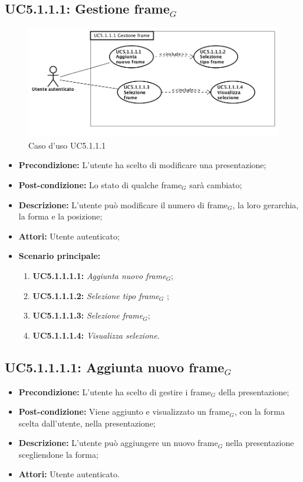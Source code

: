 \subsection{ UC5.1.1.1: Gestione frame$_G$}

\begin{figure}[h]
	\begin{center}
	\includegraphics[scale=0.4]{diagram/UC5-1-1-1.png}
	\caption{Caso d'uso UC5.1.1.1}
	\end{center}
\end{figure}
\begin{itemize}
	\item \textbf{Precondizione:} L'utente ha scelto di modificare una presentazione;
	\item \textbf{Post-condizione:} Lo stato di qualche frame$_G$ sarà cambiato;
	\item \textbf{Descrizione:} L'utente può modificare il numero di frame$_G$, la loro gerarchia, la forma e la posizione;
	\item \textbf{Attori:} Utente autenticato;
	\item \textbf{Scenario principale:}
	\begin{enumerate}
		\item \textbf{ UC5.1.1.1.1:} \textit{ Aggiunta nuovo frame$_G$};
		\item \textbf{ UC5.1.1.1.2:} \textit{ Selezione tipo frame$_G$ };
		\item \textbf{ UC5.1.1.1.3:} \textit{ Selezione frame$_G$};
		\item \textbf{ UC5.1.1.1.4:} \textit{ Visualizza selezione}.
	\end{enumerate}
\end{itemize}
\subsection{ UC5.1.1.1.1: Aggiunta nuovo frame$_G$}

\begin{itemize}
	\item \textbf{Precondizione:} L'utente ha scelto di gestire i frame$_G$ della presentazione;
	\item \textbf{Post-condizione:} Viene aggiunto e visualizzato un frame$_G$, con la forma scelta dall'utente, nella presentazione;
	\item \textbf{Descrizione:} L'utente può aggiungere un nuovo frame$_G$ nella presentazione scegliendone la forma;
	\item \textbf{Attori:} Utente autenticato.
\end{itemize}
